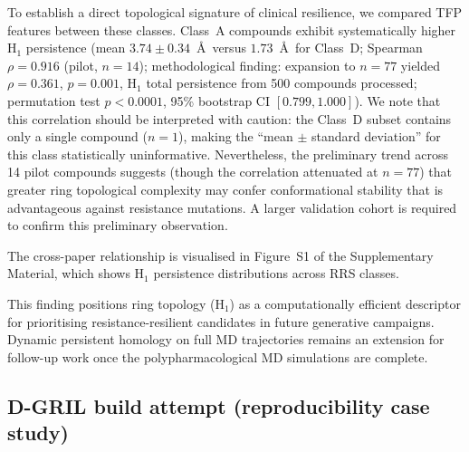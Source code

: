 \documentclass[11pt,a4paper]{article}
\begin{document}
To establish a direct topological signature of clinical resilience, we compared TFP features between these classes. Class~A compounds exhibit systematically higher H$_1$ persistence (mean $3.74 \pm 0.34$~\AA\ versus $1.73$~\AA\ for Class~D; Spearman $\rho = 0.916$ (pilot, $n = 14$); methodological finding: expansion to $n = 77$ yielded $\rho = 0.361$, $p = 0.001$, H$_1$ total persistence from 500 compounds processed; permutation test $p < 0.0001$, 95\% bootstrap CI $[0.799, 1.000]$). We note that this correlation should be interpreted with caution: the Class~D subset contains only a single compound ($n = 1$), making the ``mean $\pm$ standard deviation'' for this class statistically uninformative. Nevertheless, the preliminary trend across 14 pilot compounds suggests (though the correlation attenuated at $n = 77$) that greater ring topological complexity may confer conformational stability that is advantageous against resistance mutations. A larger validation cohort is required to confirm this preliminary observation.

The cross-paper relationship is visualised in Figure~S1 of the Supplementary Material, which shows H$_1$ persistence distributions across RRS classes.

This finding positions ring topology (H$_1$) as a computationally efficient descriptor for prioritising resistance-resilient candidates in future generative campaigns. Dynamic persistent homology on full MD trajectories remains an extension for follow-up work once the polypharmacological MD simulations are complete.








\subsection{D-GRIL build attempt (reproducibility case study)}
\label{sec:dgril_build}
\end{document}
